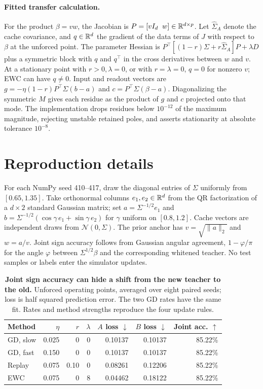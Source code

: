 \paragraph{Fitted transfer calculation.}
For the product \(\beta=vw\), the Jacobian is \(P=[vI_d\;\;w]\in\mathbb{R}^{d\times p}\). Let \(\widehat\Sigma_A\) denote the cache covariance, and \(q\in\mathbb{R}^d\) the gradient of the data terms of \(J\) with respect to \(\beta\) at the unforced point. The parameter Hessian is \(P^\top[(1-r)\Sigma+r\widehat\Sigma_A]P+\lambda D\) plus a symmetric block with \(q\) and \(q^\top\) in the cross derivatives between \(w\) and \(v\). At a stationary point with \(r>0,\lambda=0\), or with \(r=\lambda=0\), \(q=0\) for nonzero \(v\); EWC can have \(q\neq0\). Input and readout vectors are \(g=-\eta(1-r)P^\top\Sigma(b-a)\) and \(c=P^\top\Sigma(\beta-a)\). Diagonalizing the symmetric \(M\) gives each residue as the product of \(g\) and \(c\) projected onto that mode. The implementation drops residues below \(10^{-12}\) of the maximum magnitude, rejecting unstable retained poles, and asserts stationarity at absolute tolerance \(10^{-8}\).

\section{Reproduction details}
\label{app:details}

For each NumPy seed 410--417, draw the diagonal entries of \(\Sigma\) uniformly from \([0.65,1.35]\). Take orthonormal columns \(e_1,e_2\in\mathbb{R}^d\) from the QR factorization of a \(d\times2\) standard Gaussian matrix; set \(a=\Sigma^{-1/2}e_1\) and \(b=\Sigma^{-1/2}(\cos\gamma\,e_1+\sin\gamma\,e_2)\) for \(\gamma\) uniform on \([0.8,1.2]\). Cache vectors are independent draws from \(\mathcal{N}(0,\Sigma)\). The prior anchor has \(v=\sqrt{\|a\|_2}\) and \(w=a/v\). Joint sign accuracy follows from Gaussian angular agreement, \(1-\varphi/\pi\) for the angle \(\varphi\) between \(\Sigma^{1/2}\beta\) and the corresponding whitened teacher. No test samples or labels enter the simulator updates.

\begin{table}[htbp]
  \centering
  \caption{\textbf{Joint sign accuracy can hide a shift from the new teacher to the old.}
  Unforced operating points, averaged over eight paired seeds; loss is half squared prediction error. The two GD rates have the same fit. Rates and method strengths reproduce the four update rules.}
  \label{tab:unforced}
  \begin{tabular}{lrrrrrr}
    \toprule
    Method & \(\eta\) & \(r\) & \(\lambda\) & \(A\) loss \(\downarrow\) & \(B\) loss \(\downarrow\) & Joint acc. \(\uparrow\) \\
    \midrule
    GD, slow & 0.025 & 0 & 0 & 0.10137 & 0.10137 & 85.22\% \\
    GD, fast & 0.150 & 0 & 0 & 0.10137 & 0.10137 & 85.22\% \\
    Replay & 0.075 & 0.10 & 0 & 0.08261 & 0.12206 & 85.22\% \\
    EWC & 0.075 & 0 & 8 & 0.04462 & 0.18122 & 85.22\% \\
    \bottomrule
  \end{tabular}
\end{table}

